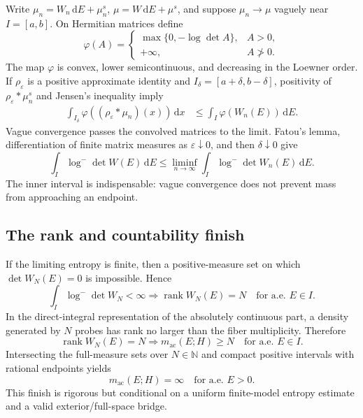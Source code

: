 \documentclass[11pt]{article}
\newcommand{\N}{\mathbb N}
\newcommand{\ac}{\mathrm{ac}}
\newcommand{\dd}{\,\mathrm d}
\newcommand{\eps}{\varepsilon}
\DeclareMathOperator{\rank}{rank}
\theoremstyle{definition}
\theoremstyle{remark}
\begin{document}
Write $\mu_n=W_n\dd E+\mu_n^s$, $\mu=W\dd E+\mu^s$, and suppose $\mu_n\to\mu$ vaguely near $I=[a,b]$.  On Hermitian matrices define
\begin{equation}
 \varphi(A)=
 \begin{cases}
  \max\{0,-\log\det A\},&A>0,\\
  +\infty,&A\not>0.
 \end{cases}
 \label{eq:audit-entropy-integrand}
\end{equation}
The map $\varphi$ is convex, lower semicontinuous, and decreasing in the Loewner order.  If $\rho_\eps$ is a positive approximate identity and $I_\delta=[a+\delta,b-\delta]$, positivity of $\rho_\eps*\mu_n^s$ and Jensen's inequality imply
\begin{align}
 \int_{I_\delta}\varphi((\rho_\eps*\mu_n)(x))\dd x
 &\leq
 \int_I\varphi(W_n(E))\dd E.
 \label{eq:audit-mollified-entropy}
\end{align}
Vague convergence passes the convolved matrices to the limit.  Fatou's lemma, differentiation of finite matrix measures as $\eps\downarrow0$, and then $\delta\downarrow0$ give
\begin{equation}
 \int_I\log^-\det W(E)\dd E
 \leq\liminf_{n\to\infty}
 \int_I\log^-\det W_n(E)\dd E.
 \label{eq:audit-lsc}
\end{equation}
The inner interval is indispensable: vague convergence does not prevent mass from approaching an endpoint.

\subsection{The rank and countability finish}

If the limiting entropy is finite, then a positive-measure set on which $\det W_N(E)=0$ is impossible.  Hence
\begin{equation}
 \int_I\log^-\det W_N<\infty
 \Longrightarrow
 \rank W_N(E)=N\quad\text{for a.e. }E\in I.
 \label{eq:audit-rank-density}
\end{equation}
In the direct-integral representation of the absolutely continuous part, a density generated by $N$ probes has rank no larger than the fiber multiplicity.  Therefore
\begin{equation}
 \rank W_N(E)=N
 \Longrightarrow
 m_{\ac}(E;H)\geq N
 \quad\text{for a.e. }E\in I.
 \label{eq:audit-rank-multiplicity}
\end{equation}
Intersecting the full-measure sets over $N\in\N$ and compact positive intervals with rational endpoints yields
\begin{equation}
 m_{\ac}(E;H)=\infty
 \quad\text{for a.e. }E>0.
 \label{eq:audit-countability}
\end{equation}
This finish is rigorous but conditional on a uniform finite-model entropy estimate and a valid exterior/full-space bridge.
\end{document}
